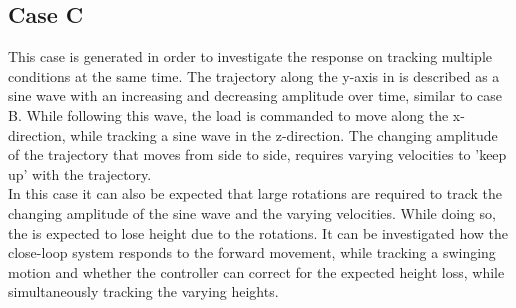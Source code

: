 \subsection*{Case C}
This case is generated in order to investigate the response on tracking multiple conditions at the same time.  
The trajectory along the y-axis in \IF is described as a sine wave with an increasing and decreasing amplitude over time, similar to case B.
While following this wave, the load is commanded to move along the x-direction, while tracking a sine wave in the z-direction.
The changing amplitude of the trajectory that moves from side to side, requires varying velocities to 'keep up' with the trajectory. \\
In this case it can also be expected that large  rotations are required to track the changing amplitude of the sine wave and the varying velocities.
While doing so, the  is expected to lose height due to the rotations.
It can be investigated how the close-loop system responds to the forward movement, while tracking a swinging motion and whether the controller can correct for the expected height loss, while simultaneously tracking the varying heights. 

